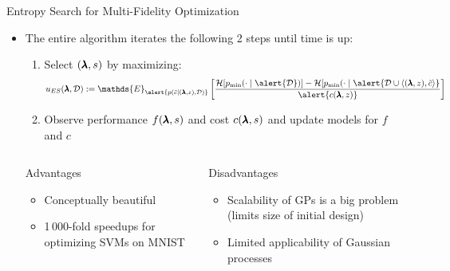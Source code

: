 \begin{frame}[c]{Entropy Search for Multi-Fidelity Optimization }

\begin{itemize}
    \item The entire algorithm iterates the following 2 steps until time is up:
		\begin{enumerate}
			\item Select $(\pmb{\lambda},s)$ by maximizing:
    			\[{\acq}_{ES}(\conf,\dataset) := \mathds{E}_{\alert{p(\tilde{\cost}\mid (\conf, z), \dataset)}} 
            	\left[   \frac{\mathcal{H}[p_{\text{min}}(\cdot \mid \alert{\dataset})] - \mathcal{H}[p_{\text{min}}(\cdot \mid \alert{\dataset \cup \left\langle (\conf,z), \tilde{\cost} \right\rangle}}{\alert{c(\conf,z)}} \right]\]
			\item Observe performance $f(\pmb{\lambda},s)$ and cost $c(\pmb{\lambda},s)$ and update models for $f$ and $c$ 
		\end{enumerate}

\pause

\begin{columns}[T] %
\begin{column}{.48\textwidth}


    \begin{block}{Advantages}
    \begin{itemize}
    	\item Conceptually beautiful
    	\item 1\,000-fold speedups for optimizing SVMs on MNIST
    \end{itemize}
    \end{block}
\pause
\end{column}%

\hfill%

\begin{column}{.48\textwidth}

    \begin{block}{Disadvantages}
    \begin{itemize}
    	\item \alert{Scalability} of GPs is a big problem (limits size of initial design)
    	\item Limited applicability of Gaussian processes
    \end{itemize}
\end{block}

\end{column}
\end{columns}   

\end{itemize}
\end{frame}


